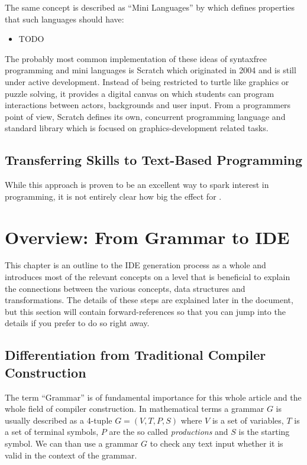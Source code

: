 The same concept is described as \enquote{Mini Languages} by \cite{brusilovsky_mini-languages_1997} which defines properties that such languages should have:

\begin{itemize}
\item TODO
\end{itemize}

The probably most common implementation of these ideas of syntaxfree programming and mini languages is Scratch which originated in 2004 \cite{maloney_scratch_2004} and is still under active development. Instead of being restricted to turtle like graphics or puzzle solving, it provides a digital canvas on which students can program interactions between actors, backgrounds and user input. From a programmers point of view, Scratch defines its own, concurrent programming language and standard library which is focused on graphics-development related tasks.

\subsection{Transferring Skills to Text-Based Programming}

While this approach is proven to be an excellent way to spark interest in programming, it is not entirely clear how big the effect for .

\section{Overview: From Grammar to IDE}

This chapter is an outline to the IDE generation process as a whole and introduces most of the relevant concepts on a level that is beneficial to explain the connections between the various concepts, data structures and transformations. The details of these steps are explained later in the document, but this section will contain forward-references so that you can jump into the details if you prefer to do so right away.

\subsection{Differentiation from Traditional Compiler Construction}
\label{sec:diff-traditional-compiler}

The term \enquote{Grammar} is of fundamental importance for this whole article and the whole field of compiler construction. In mathematical terms a grammar $G$ is usually described as a 4-tuple $G = (V, T, P, S)$ where $V$ is a set of variables, $T$ is a set of terminal symbols, $P$ are the so called \textit{productions} and $S$ is the starting symbol\cite[Chapter 5]{hopcroft_formal_languages}. We can than use a grammar $G$ to check any text input whether it is valid in the context of the grammar.

